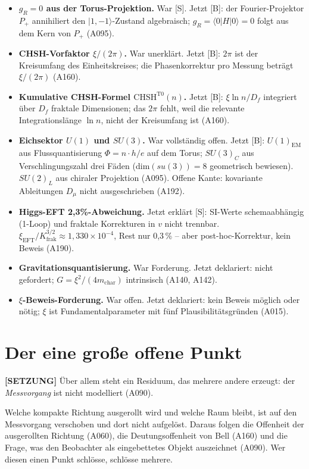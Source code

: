 \begin{itemize}[leftmargin=2em,itemsep=3pt,topsep=3pt]
  \item \textbf{$g_R=0$ aus der Torus-Projektion.} War [S]. Jetzt [B]: der
    Fourier-Projektor $P_+$ annihiliert den $|1,-1\rangle$-Zustand algebraisch;
    $g_R=\langle0|H|0\rangle=0$ folgt aus dem Kern von $P_+$ (A095).
  \item \textbf{CHSH-Vorfaktor $\xi/(2\pi)$.} War unerklärt. Jetzt [B]:
    $2\pi$ ist der Kreisumfang des Einheitskreises; die Phasenkorrektur pro
    Messung beträgt $\xi/(2\pi)$ (A160).
  \item \textbf{Kumulative CHSH-Formel $\text{CHSH}^{\text{T0}}(n)$.} Jetzt [B]:
    $\xi\ln n/D_f$ integriert über $D_f$ fraktale Dimensionen; das $2\pi$
    fehlt, weil die relevante Integrationslänge $\ln n$, nicht der Kreisumfang
    ist (A160).
  \item \textbf{Eichsektor $U(1)$ und $SU(3)$.} War vollständig offen. Jetzt
    [B]: $U(1)_\text{EM}$ aus Flussquantisierung $\Phi=n\cdot h/e$ auf dem
    Torus; $SU(3)_C$ aus Verschlingungszahl drei Fäden (dim$(su(3))=8$
    geometrisch bewiesen). $SU(2)_L$ aus chiraler Projektion (A095). Offene
    Kante: kovariante Ableitungen $D_\mu$ nicht ausgeschrieben (A192).
  \item \textbf{Higgs-EFT 2,3\%-Abweichung.} Jetzt erklärt [S]: SI-Werte
    schemaabhängig (1-Loop) und fraktale Korrekturen in $v$ nicht trennbar.
    $\xi_\text{EFT}/K_\text{frak}^{3/2}\approx1{,}330\times10^{-4}$, Rest
    nur 0,3\,\% -- aber post-hoc-Korrektur, kein Beweis (A190).
  \item \textbf{Gravitationsquantisierung.} War Forderung. Jetzt deklariert:
    nicht gefordert; $G=\xi^2/(4m_\text{char})$ intrinsisch (A140, A142).
  \item \textbf{$\xi$-Beweis-Forderung.} War offen. Jetzt deklariert: kein
    Beweis möglich oder nötig; $\xi$ ist Fundamentalparameter mit fünf
    Plausibilitätsgründen (A015).
\end{itemize}

\section{Der eine große offene Punkt}

\textbf{[SETZUNG]} Über allem steht ein Residuum, das mehrere andere erzeugt:
der \emph{Messvorgang} ist nicht modelliert (A090).

Welche kompakte Richtung ausgerollt wird und welche Raum bleibt, ist auf den
Messvorgang verschoben und dort nicht aufgelöst. Daraus folgen die Offenheit der
ausgerollten Richtung (A060), die Deutungsoffenheit von Bell (A160) und die
Frage, was den Beobachter als eingebettetes Objekt auszeichnet (A090). Wer diesen
einen Punkt schlösse, schlösse mehrere.

